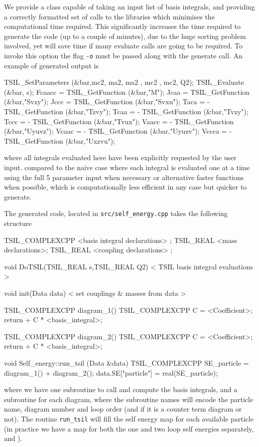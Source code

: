 We provide a class capable of taking an input list of basis integrals, and providing a correctly formatted set of calls to the \tsil libraries which minimises the computational time required.  This significantly increases the time required to generate the code (up to a couple of minutes), due to the huge sorting problem involved, yet will save time if many evaluate calls are going to be required.  To invoke this option the flag \lstinline{-o} must be passed along with the generate call.  An example of generated output is

\begin{lstcpp}
TSIL_SetParameters (&bar,mc2, ma2, ma2 , mc2 , mc2, Q2);
TSIL_Evaluate (&bar, s);
Fcaacc =   TSIL_GetFunction (&bar,"M");
Jcaa   =   TSIL_GetFunction (&bar,"Svzy");
Jccc   =   TSIL_GetFunction (&bar,"Svxu");
Taca   = - TSIL_GetFunction (&bar,"Tzvy");
Tcaa   = - TSIL_GetFunction (&bar,"Tvzy");
Tccc   = - TSIL_GetFunction (&bar,"Tvux");
Vaacc  = - TSIL_GetFunction (&bar,"Uyuvz");
Vcaac  = - TSIL_GetFunction (&bar,"Uyuzv");
Vccca  = - TSIL_GetFunction (&bar,"Uxzvu");
\end{lstcpp}
where all integrals evaluated here have been explicitly requested by the user input.
compared to the naive case where each integral is evaluated one at a time using the full 5 parameter input when necessary or alternative faster functions when possible, which is computationally less efficient in any case but quicker to generate.

The generated code, located in \lstinline{src/self_energy.cpp} takes the following structure
\begin{lstcpp}
TSIL_COMPLEXCPP  <basis integral declarations> ;
TSIL_REAL  <mass declarations>;
TSIL_REAL  <coupling declarations> ;

void DoTSIL(TSIL_REAL s,TSIL_REAL Q2)
{
	< TSIL basis integral evaluations >
}

void init(Data data) 
{
	< set couplings & masses from data >
}

TSIL_COMPLEXCPP  diagram_1()
{
	TSIL_COMPLEXCPP C =  <Coefficient>;
	return  + C * <basis_integral>;
}

TSIL_COMPLEXCPP  diagram_2()
{
	TSIL_COMPLEXCPP C =  <Coefficient>;
	return  + C * <basis_integral>;
}

void Self_energy::run_tsil (Data &data) 
{
	TSIL_COMPLEXCPP SE_particle = diagram_1() + diagram_2();
	data.SE["particle"] = real(SE_particle);
}
\end{lstcpp}

where we have one subroutine to call \tsil and compute the basis integrals, and a subroutine for each diagram, where the subroutine names will encode the particle name, diagram number and loop order (and if it is a counter term diagram or not).  The routine \lstinline{run_tsil} will fill the self energy map for each available particle (in practice we have a map for both the one and two loop self energies separately,  and ).

